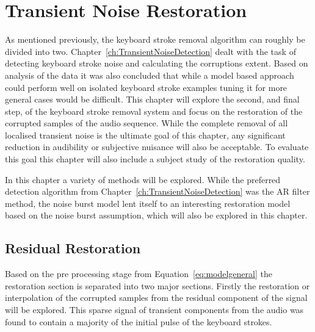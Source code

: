 \chapter{Transient Noise Restoration}\label{ch:TransientNoiseRestoration}

\ifpdf
    \graphicspath{{Chapter6_TransNoiseRest/Chapter6Figs/PNG/}{Chapter6_TransNoiseRest/Chapter6Figs/PDF/}{Chapter6_TransNoiseRest/Chapter6Figs/}{Chapter6_TransNoiseRest/Chapter6Figs/Subjective/}{Chapter6_TransNoiseRest/Chapter6Figs/Results/}{Chapter6_TransNoiseRest/Chapter6Figs/waveformResultsFinalHello123/}}
\else
    \graphicspath{{Chapter6_TransNoiseRest/Chapter6Figs/EPS/}{Chapter6_TransNoiseRest/Chapter6Figs/}}
\fi

As mentioned previously, the keyboard stroke removal algorithm can roughly be divided into two. Chapter~\ref{ch:TransientNoiseDetection} dealt with the task of detecting keyboard stroke noise and calculating the corruptions extent. Based on analysis of the data it was also concluded that while a model based approach could perform well on isolated keyboard stroke examples tuning it for more general cases would be difficult. This chapter will explore the second, and final step, of the keyboard stroke removal system and focus on the restoration of the corrupted samples of the audio sequence. While the complete removal of all localised transient noise is the ultimate goal of this chapter, any significant reduction in audibility or subjective nuisance will also be acceptable. To evaluate this goal this chapter will also include a subject study of the restoration quality.

In this chapter a variety of methods will be explored. While the preferred detection algorithm from Chapter~\ref{ch:TransientNoiseDetection} was the AR filter method, the noise burst model lent itself to an interesting restoration model based on the noise burst assumption, which will also be explored in this chapter.


\section{Residual Restoration}
Based on the pre processing stage from Equation~\ref{eq:modelgeneral} the restoration section is separated into two major sections. Firstly the restoration or interpolation of the corrupted samples from the residual component of the signal will be explored. This sparse signal of transient components from the audio was found to contain a majority of the initial pulse of the keyboard strokes.

